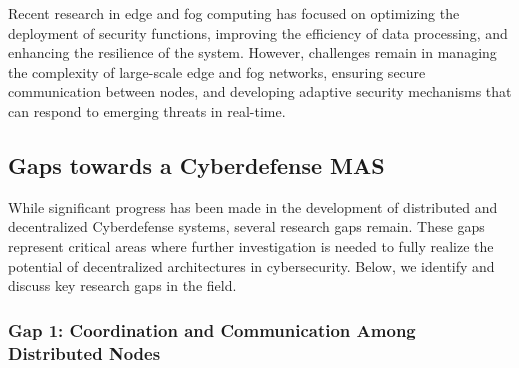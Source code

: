 Recent research in edge and fog computing has focused on optimizing the deployment of security functions, improving the efficiency of data processing, and enhancing the resilience of the system. However, challenges remain in managing the complexity of large-scale edge and fog networks, ensuring secure communication between nodes, and developing adaptive security mechanisms that can respond to emerging threats in real-time.

\subsection{Gaps towards a Cyberdefense MAS}

While significant progress has been made in the development of distributed and decentralized Cyberdefense systems, several research gaps remain. These gaps represent critical areas where further investigation is needed to fully realize the potential of decentralized architectures in cybersecurity. Below, we identify and discuss key research gaps in the field.





\subsubsection{Gap 1: Coordination and Communication Among Distributed Nodes}

